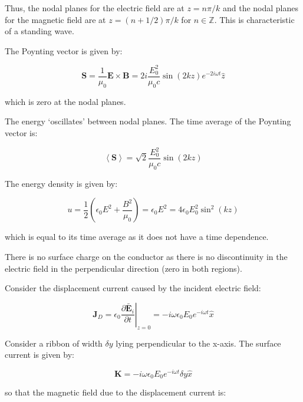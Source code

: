 \documentclass[12pt]{article}
\begin{document}
Thus, the nodal planes for the electric field are at $z = n\pi/k$ and the nodal planes for the magnetic field are at $z = (n+1/2)\pi/k$ for $n \in \mathbb{Z}$. This is characteristic of a standing wave.

The Poynting vector is given by:

\begin{equation}
    \mathbf{S} = \frac{1}{\mu_{0}} \mathbf{E} \times \mathbf{B} = 2i \frac{E_{0}^{2}}{\mu_{0}c} \sin{(2kz)} e^{-2i\omega t} \hat{z}
\end{equation}

which is zero at the nodal planes.

The energy `oscillates' between nodal planes. The time average of the Poynting vector is:

\begin{equation}
    \left\langle \mathbf{S} \right\rangle = \sqrt{2} \frac{E_{0}^{2}}{\mu_{0}c} \sin{(2kz)}
\end{equation}

The energy density is given by:

\begin{equation}
    u = \frac{1}{2} \left( \epsilon_{0} E^{2} + \frac{B^{2}}{\mu_{0}} \right) = \epsilon_{0} E^{2} = 4 \epsilon_{0} E_{0}^{2} \sin^{2}{(kz)}
\end{equation}

which is equal to its time average as it does not have a time dependence.

There is no surface charge on the conductor as there is no discontinuity in the electric field in the perpendicular direction (zero in both regions).

Consider the displacement current caused by the incident electric field:

\begin{equation}
    \mathbf{J}_{D} = \left. \epsilon_{0} \frac{\partial \tilde{\mathbf{E}_{i}}}{\partial t} \right|_{z=0} = -i\omega \epsilon_{0} E_{0} e^{-i\omega t} \hat{x}
\end{equation}

Consider a ribbon of width $\delta y$ lying perpendicular to the x-axis. The surface current is given by:

\begin{equation}
    \mathbf{K} = -i\omega \epsilon_{0} E_{0} e^{-i\omega t} \delta y \hat{x}
\end{equation}

so that the magnetic field due to the displacement current is:
\end{document}
